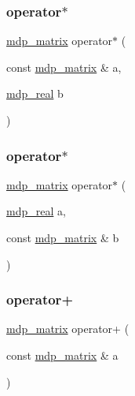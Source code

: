 \mbox{\label{classmdp__matrix_a8edf780fc5b5509630fda4dba30c8b87}} 
\subsubsection{\texorpdfstring{operator$\ast$}{operator*}\hspace{0.1cm}{\footnotesize\ttfamily [4/5]}}
{\footnotesize\ttfamily \hyperlink{classmdp__matrix}{mdp\+\_\+matrix} operator$\ast$ (\begin{DoxyParamCaption}\item[{const \hyperlink{classmdp__matrix}{mdp\+\_\+matrix} \&}]{a,  }\item[{\hyperlink{mdp__global__vars_8h_a69d96b74c791e0bbdb888b3913a69450}{mdp\+\_\+real}}]{b }\end{DoxyParamCaption})\hspace{0.3cm}{\ttfamily [friend]}}

\mbox{\label{classmdp__matrix_a0518710232891fb4bded31598cc6cd5e}} 
\subsubsection{\texorpdfstring{operator$\ast$}{operator*}\hspace{0.1cm}{\footnotesize\ttfamily [5/5]}}
{\footnotesize\ttfamily \hyperlink{classmdp__matrix}{mdp\+\_\+matrix} operator$\ast$ (\begin{DoxyParamCaption}\item[{\hyperlink{mdp__global__vars_8h_a69d96b74c791e0bbdb888b3913a69450}{mdp\+\_\+real}}]{a,  }\item[{const \hyperlink{classmdp__matrix}{mdp\+\_\+matrix} \&}]{b }\end{DoxyParamCaption})\hspace{0.3cm}{\ttfamily [friend]}}

\mbox{\label{classmdp__matrix_ac277f7b8abb06215be34e3db82ff6c0a}} 
\subsubsection{\texorpdfstring{operator+}{operator+}\hspace{0.1cm}{\footnotesize\ttfamily [1/6]}}
{\footnotesize\ttfamily \hyperlink{classmdp__matrix}{mdp\+\_\+matrix} operator+ (\begin{DoxyParamCaption}\item[{const \hyperlink{classmdp__matrix}{mdp\+\_\+matrix} \&}]{a }\end{DoxyParamCaption})\hspace{0.3cm}{\ttfamily [friend]}}

